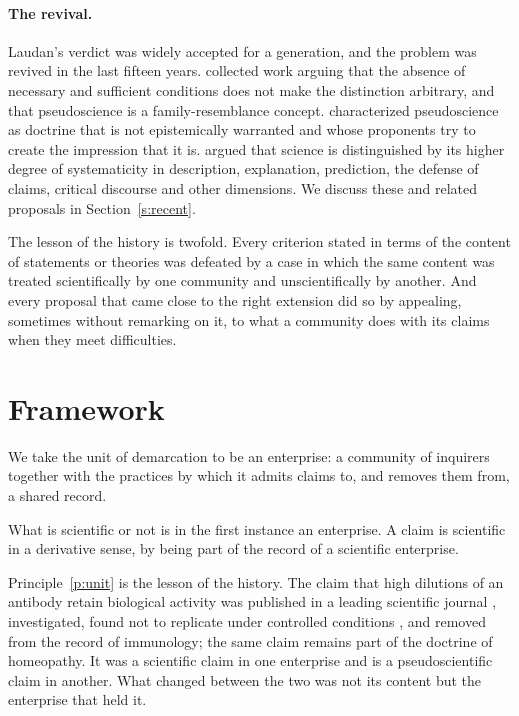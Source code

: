 \documentclass{situationist-preprint}
\begin{document}
\paragraph{The revival.} Laudan's verdict was widely accepted for a generation, and the problem was revived in the last fifteen years. \citet{PigliucciBoudry2013} collected work arguing that the absence of necessary and sufficient conditions does not make the distinction arbitrary, and that pseudoscience is a family-resemblance concept. \citet{Hansson2013} characterized pseudoscience as doctrine that is not epistemically warranted and whose proponents try to create the impression that it is. \citet{HoyningenHuene2013} argued that science is distinguished by its higher degree of systematicity in description, explanation, prediction, the defense of claims, critical discourse and other dimensions. We discuss these and related proposals in Section~\ref{s:recent}.

The lesson of the history is twofold. Every criterion stated in terms of the content of statements or theories was defeated by a case in which the same content was treated scientifically by one community and unscientifically by another. And every proposal that came close to the right extension did so by appealing, sometimes without remarking on it, to what a community does with its claims when they meet difficulties.

\section{Framework}\label{s:framework}

We take the unit of demarcation to be an enterprise: a community of inquirers together with the practices by which it admits claims to, and removes them from, a shared record.

\begin{principle}[Unit]\label{p:unit}
What is scientific or not is in the first instance an enterprise. A claim is scientific in a derivative sense, by being part of the record of a scientific enterprise.
\end{principle}

Principle~\ref{p:unit} is the lesson of the history. The claim that high dilutions of an antibody retain biological activity was published in a leading scientific journal \citep{Davenas1988}, investigated, found not to replicate under controlled conditions \citep{Maddox1988}, and removed from the record of immunology; the same claim remains part of the doctrine of homeopathy. It was a scientific claim in one enterprise and is a pseudoscientific claim in another. What changed between the two was not its content but the enterprise that held it.
\end{document}
